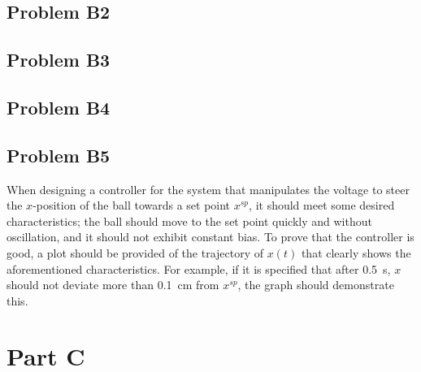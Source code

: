 \documentclass[a4paper,10pt,reqno]{amsart}
\numberwithin{equation}{section}
\begin{document}
\subsection{Problem B2}\label{sec:b2}


\subsection{Problem B3}\label{sec:b3}


\subsection{Problem B4}\label{sec:b4}




\subsection{Problem B5}\label{sec:b5}

When designing a controller for the system that manipulates the voltage to steer the $x$-position of the ball towards a set point $x^{sp}$, it should meet some desired characteristics; the ball should move to the set point quickly and without oscillation, and it should not exhibit constant bias. To prove that the controller is good, a plot should be provided of the trajectory of $x(t)$ that clearly shows the aforementioned characteristics. For example, if it is specified that after 0.5~s, $x$ should not deviate more than 0.1~cm from $x^{sp}$, the graph should demonstrate this.

\section{Part C}
\end{document}

